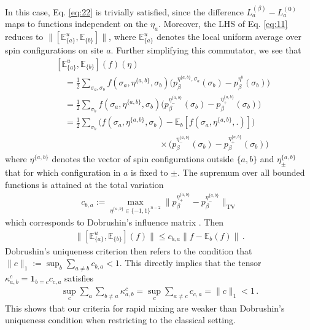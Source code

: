 \documentclass[aps,pra,amsmath,amssymb,twocolumn,10pt]{revtex4-2}
\theoremstyle{definition}
\begin{document}
	In this case, Eq. \eqref{eq:22} is trivially satisfied, since the difference $L_a^{(\beta)}-L_a^{(0)}$ maps to functions independent on the $\eta_a$. Moreover, the LHS of Eq. \eqref{eq:11} reduces to
	$\|[\mathbb{E}^{{u}}_{\{a\}},\mathbb{E}_{\{b\}}] \|$, where $\mathbb{E}^{{u}}_{\{a\}}$ denotes the local uniform average over spin configurations on site $a$. Further simplifying this commutator, we see that
	\begin{align*}
		&[\mathbb{E}^{{u}}_{\{a\}},\mathbb{E}_{\{b\}}](f)(\eta)\\
		&\quad= \frac{1}{2}\sum_{\sigma_a,\sigma_b}f(\sigma_a,\eta^{\{a,b\}},\sigma_b)\Big( p_\beta^{\eta^{\{a,b\}},\sigma_a}(\sigma_b)-p_\beta^{\eta^{b}}(\sigma_b)\Big)\\
		&\quad =\frac{1}{2}\sum_{\sigma_b}f(\sigma_a,\eta^{\{a,b\}},\sigma_b)\big(p_\beta^{\eta_-^{\{a,b\}}}(\sigma_b)-p_\beta^{\eta_+^{\{a,b\}}}(\sigma_b)\big)\\
		&\quad =\frac{1}{2}\sum_{\sigma_b}\big(f(\sigma_a,\eta^{\{a,b\}},\sigma_b)-\mathbb{E}_b[f(\sigma_a,\eta^{\{a,b\}},.)]\big)\\
		&\qquad\qquad\qquad\qquad\qquad\qquad \times\big(p_\beta^{\eta_-^{\{a,b\}}}(\sigma_b)-p_\beta^{\eta_+^{\{a,b\}}}(\sigma_b)\big)
	\end{align*}
	where $\eta^{\{a,b\}}$ denotes the vector of spin configurations outside $\{a,b\}$ and $\eta^{\{a,b\}}_{\pm}$ that for which configuration in $a$ is fixed to $\pm$. 
	The supremum over all bounded functions is attained at the total variation
	\begin{align*}
		c_{b,a}:=\!\!\max_{{\eta^{\{a,b\}}\in\{-1,1\}^{n-2}}}\Big\|p_\beta^{\eta_+^{\{a,b\}}}-p_\beta^{\eta_-^{\{a,b\}}}\Big\|_{\operatorname{TV}}
	\end{align*}
	which corresponds to Dobrushin's influence matrix \cite{dobrushin1970prescribing}. Then
	\begin{align*}
		\|[\mathbb{E}^{{u}}_{\{a\}},\mathbb{E}_{\{b\}}](f)\|\le  c_{b,a}\|f-\mathbb{E}_b(f)\|\,.
	\end{align*}
	Dobrushin's uniqueness criterion then refers to the condition that $\|c\|_1:=\sup_b\sum_{a\ne b}c_{b,a}<1$. This directly implies that the tensor $\kappa_{a,b}^c=\mathbf{1}_{b=c}c_{c,a}$ satisfies
	\begin{align*}
		\sup_c\sum_a\sum_{b\ne a}\kappa^c_{a,b}=\sup_c\sum_{a\ne c}c_{c,a} =\|c\|_1<1\,.
	\end{align*}
	This shows that our criteria for rapid mixing are weaker than Dobrushin's uniqueness condition when restricting to the classical setting.
\end{document}

